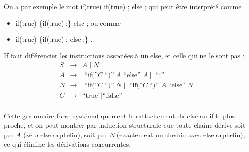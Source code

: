 \begin{corrections}

  \begin{questions}
  \item On a par exemple le mot \og{} if(true) if(true) ; else ; \fg{}
    qui peut être interprété comme
    \begin{itemize}
    \item \og{} if(true) \{if(true) ;\} else ; \fg{} ou comme 
    \item \og{} if(true) \{if(true) ; else ;\} \fg.
    \end{itemize}
    


  \item If faut différencier les instructions associées à un else, et celle qui ne le sont pas :
    $$\begin{array}{rrl}
    \mathit{S} &\rightarrow& A \mid N \\
    \mathit{A} & \rightarrow & \text{ ``if(''} C \text{ ``)'' } A \text{ ``else'' } A  \mid \text{ ``;''} \\
    \mathit{N} & \rightarrow &  \text{ ``if(''} C \text{ ``)'' } N \mid \text{ ``if(''} C \text{ ``)'' } A \text{ ``else'' } N\\
    \mathit{C} &\rightarrow& \text{``true''} \mid \text{``false''} \\
  \end{array}$$

  \item Cette grammaire force systématiquement le rattachement du else au if le plus proche,
    et on peut montrer par induction structurale que toute chaîne dérive soit par $A$
    (zéro else orphelin), soit par $N$ (exactement un chemin avec else orphelin),
    ce qui élimine les dérivations concurrentes.

  \end{questions}

\end{corrections}

\endgroup
\endinput
